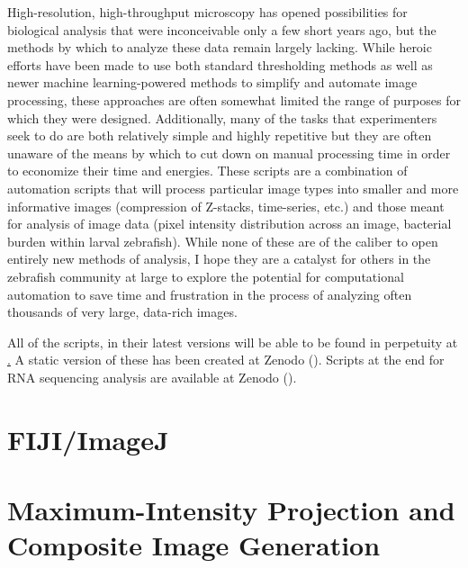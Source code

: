 


High-resolution, high-throughput microscopy has opened possibilities for biological analysis that were inconceivable only a few short years ago, but the methods by which to analyze these data remain largely lacking. While heroic efforts have been made to use both standard thresholding methods as well as newer machine learning-powered methods to simplify and automate image processing, these approaches are often somewhat limited the range of purposes for which they were designed. Additionally, many of the tasks that experimenters seek to do are both relatively simple and highly repetitive but they are often unaware of the means by which to cut down on manual processing time in order to economize their time and energies. These scripts are a combination of automation scripts that will process particular image types into smaller and more informative images (compression of Z-stacks, time-series, etc.) and those meant for analysis of image data (pixel intensity distribution across an image, bacterial burden within larval zebrafish). While none of these are of the caliber to open entirely new methods of analysis, I hope they are a catalyst for others in the zebrafish community at large to explore the potential for computational automation to save time and frustration in the process of analyzing often thousands of very large, data-rich images.

All of the scripts, in their latest versions will be able to be found in perpetuity at \href{http://github.com/jaredbrewer/image-analysis}. A static version of these has been created at Zenodo (). Scripts at the end for RNA sequencing analysis are available at Zenodo (). 

\section{FIJI/ImageJ}\label{fiji}



\section{Maximum-Intensity Projection and Composite Image Generation}

